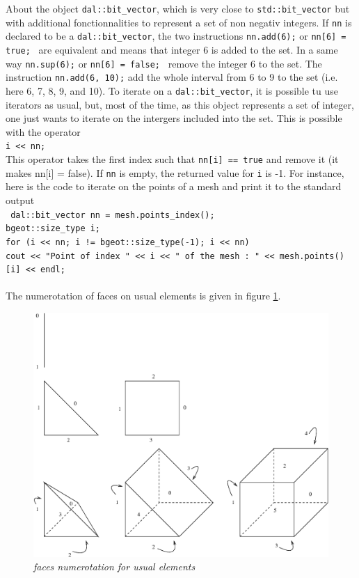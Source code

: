 \documentclass[11pt,a4paper]{article}
\begin{document}
About the object {\tt dal::bit\_vector}, which is very close to {\tt std::bit\_vector} but with additional fonctionnalities to represent a set of non negativ integers. If {\tt nn} is declared to be a {\tt dal::bit\_vector}, the two instructions {\tt nn.add(6);} or {\tt nn[6] = true; } are equivalent and means that integer 6 is added to the set. In a same way {\tt nn.sup(6);} or {\tt nn[6] = false; } remove the integer 6 to the set. The instruction {\tt nn.add(6, 10);} add the whole interval from 6 to 9 to the set (i.e. here 6, 7, 8, 9, and 10). To iterate on a {\tt dal::bit\_vector}, it is possible tu use iterators as usual,  but, most of the time, as this object represents a set of integer, one just wants to iterate on the intergers included into the set. This is possible with the operator \\[0.5cm]
{\tt i << nn; } \\[0.5cm]
This operator takes the first index such that {\tt nn[i] == true} and remove it (it makes nn[i] = false). If {\tt nn} is empty, the returned value for {\tt i} is -1. For instance, here is the code to iterate on the points of a mesh and print it to the standard output \\[0.5cm]
{\tt
  dal::bit\_vector nn = mesh.points\_index(); \\
  bgeot::size\_type i; \\
  for (i << nn; i != bgeot::size\_type(-1); i << nn) \\
  \mbox{}\hspace{1em}  cout << "Point of index " << i << " of the mesh : " << mesh.points()[i] << endl; \\
} \\[0.5cm]
The numerotation of faces on usual elements is given in figure \ref{fig:elemf}.
\begin{figure}[htb] \label{fig:elemf}
  \begin{center}
    \includegraphics[width=15cm,angle=0]{getfemuser_elemf.eps}
  \end{center}
  \caption{ \it faces numerotation for usual elements }
\end{figure}
\end{document}
